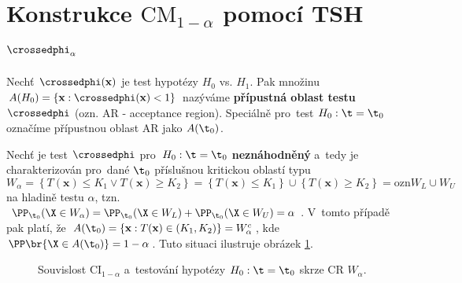 \section{Konstrukce $\mathrm{CM}_{1-\alpha}$ pomocí TSH $\crossedphi_\alpha$}\label{TSHkonst}
\begin{define}
	Nechť $\crossedphi(\textbf{x})$ je test hypotézy $H_0$ vs. $H_1$. Pak množinu $A(H_0)=\{ \textbf{x}:\crossedphi(\textbf{x})<1 \}$ nazýváme \textbf{přípustná oblast testu} $\crossedphi$ (ozn. AR - acceptance region). Speciálně pro~test $H_0:\t=\t_0$ označíme přípustnou oblast AR jako $A(\t_0)$.
\end{define}
\begin{remark}
	Nechť je test $\crossedphi$ pro~$H_0:\t=\t_0$ \textbf{neznáhodněný} a~tedy je charakterizován pro~dané $\t_0$ příslušnou kritickou oblastí typu $$W_\alpha=\left\{ T(\textbf{x})\leq K_1 \vee T(\textbf{x})\geq K_2 \right\}=\left\{ T(\textbf{x})\leq K_1 \right\}\cup\left\{ T(\textbf{x})\geq K_2 \right\}\equal{\text{ozn}}W_L\cup W_U$$
	na hladině testu $\alpha$, tzn. $\PP_{\t_0}(\X\in W_\alpha)=\PP_{\t_0}(\X\in W_L)+\PP_{\t_0}(\X\in W_U)=\alpha$. V~tomto případě pak platí, že $A(\t_0)=\left\{ \textbf{x}:T(\textbf{x})\in(K_1,K_2) \right\}=W_\alpha^c$, kde $\PP\br{\X\in A(\t_0)}=1-\alpha$. Tuto situaci ilustruje obrázek \ref{obrazek}.
\begin{figure}[h]
	\centering
	\caption{Souvislost $\mathrm{CI}_{1-\alpha}$ a~testování hypotézy $H_0:\t=\t_0$ skrze CR $W_\alpha$.}
	\label{obrazek}
\end{figure}
\end{remark}

